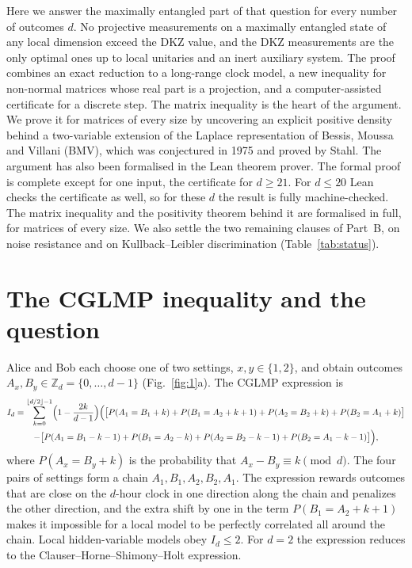 \documentclass[11pt]{article}
\newcommand{\Z}{\mathbb{Z}}
\begin{document}
Here we answer the maximally entangled part of that question for every number of outcomes $d$. No projective
measurements on a maximally entangled state of any local dimension exceed the DKZ value, and the DKZ measurements are
the only optimal ones up to local unitaries and an inert auxiliary system. The proof combines an exact reduction to a
long-range clock model, a new inequality for non-normal matrices whose real part is a projection, and a
computer-assisted certificate for a discrete step. The matrix inequality is the heart of the argument. We prove it for
matrices of every size by uncovering an explicit positive density behind a two-variable extension of the Laplace
representation of Bessis, Moussa and Villani (BMV), which was conjectured in 1975 and proved by Stahl\cite{BMV1975,
Stahl2013}. The argument has also been formalised in the Lean theorem prover\cite{Lean2021,Mathlib2020}. The formal
proof is complete except for one input, the certificate for $d\ge21$. For $d\le20$ Lean checks the certificate
as well, so for these $d$ the result is fully machine-checked. The matrix inequality and the positivity theorem behind
it are formalised in full, for matrices of every size. We also settle the two remaining clauses of Part~B, on noise
resistance and on Kullback--Leibler discrimination (Table~\ref{tab:status}).

\section*{The CGLMP inequality and the question}

Alice and Bob each choose one of two settings, $x,y\in\{1,2\}$, and obtain outcomes $A_x,B_y\in\Z_d=\{0,\dots,d-1\}$
(Fig.~\ref{fig:1}a). The CGLMP expression is\cite{CGLMP2002}
\begin{multline}\label{eq:cglmp}
I_d=\sum_{k=0}^{\lfloor d/2\rfloor-1}\Bigl(1-\frac{2k}{d-1}\Bigr)\Bigl(\bigl[P(A_1=B_1+k)+P(B_1=A_2+k+1)
+P(A_2=B_2+k)+P(B_2=A_1+k)\bigr]\\
-\bigl[P(A_1=B_1-k-1)+P(B_1=A_2-k)+P(A_2=B_2-k-1)+P(B_2=A_1-k-1)\bigr]\Bigr),
\end{multline}
where $P(A_x=B_y+k)$ is the probability that $A_x-B_y\equiv k\pmod d$. The four pairs of settings form a chain
$A_1,B_1,A_2,B_2,A_1$. The expression rewards outcomes that are close on the $d$-hour clock in one direction
along the chain and penalizes the other direction, and the extra shift by one in the term $P(B_1=A_2+k+1)$ makes it
impossible for a local model to be perfectly correlated all around the chain. Local hidden-variable models obey
$I_d\le2$\cite{CGLMP2002}. For $d=2$ the expression reduces to the Clauser--Horne--Shimony--Holt expression.
\end{document}
